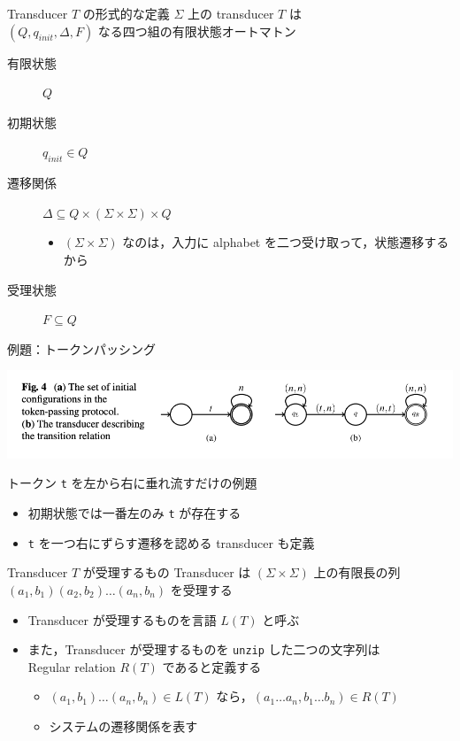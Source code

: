 \documentclass[presentation, xetex]{beamer}
\begin{document}
\begin{frame}[label={sec:org6476e9a}]{Transducer \(T\) の形式的な定義}
\(\Sigma\) 上の transducer \(T\) は \\
\((Q, q_{init}, \Delta, F)\) なる四つ組の有限状態オートマトン
\begin{description}
\item[{有限状態}] \(Q\)
\item[{初期状態}] \(q_{init} \in Q\)
\item[{遷移関係}] \(\Delta \subseteq Q \times (\Sigma \times \Sigma) \times Q\)
\begin{itemize}
\item \((\Sigma \times \Sigma)\) なのは，入力に alphabet を二つ受け取って，状態遷移するから
\end{itemize}
\item[{受理状態}] \(F \subseteq Q\)
\end{description}
\end{frame}



\begin{frame}[label={sec:orgc1ddd36},fragile]{例題：トークンパッシング}
 \begin{center}
\includegraphics[width=.9\linewidth]{./images/token-example.png}
\end{center}


トークン \texttt{t} を左から右に垂れ流すだけの例題
\begin{itemize}
\item 初期状態では一番左のみ \texttt{t} が存在する
\item \texttt{t} を一つ右にずらす遷移を認める transducer も定義
\end{itemize}
\end{frame}



\begin{frame}[label={sec:org68b10a8},fragile]{Transducer \(T\) が受理するもの}
 Transducer は \((\Sigma \times \Sigma)\) 上の有限長の列 \\
\((a_1, b_1)(a_2, b_2) \dots (a_n, b_n)\) を受理する
\begin{itemize}
\item Transducer が受理するものを言語 \(L(T)\) と呼ぶ
\item また，Transducer が受理するものを \texttt{unzip} した二つの文字列は \\
Regular relation \(R(T)\) であると定義する
\begin{itemize}
\item \((a_1, b_1) \dots (a_n, b_n) \in L(T)\) なら，\((a_1 \dots a_n, b_1 \dots b_n) \in R(T)\)
\item システムの遷移関係を表す
\end{itemize}
\end{itemize}
\end{frame}
\end{document}
